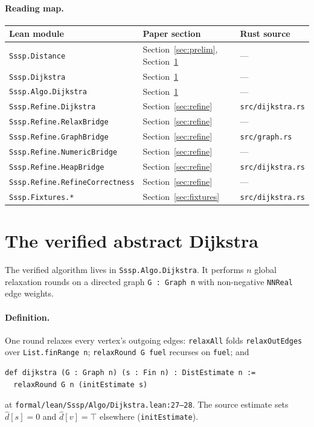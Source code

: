 \documentclass[11pt,a4paper]{article}
\providecommand{\cref}[1]{Section~\ref{#1}}
\newcommand{\Dijkstra}{Dijkstra\xspace}
\newcommand{\dhat}{\hat{d}}
\newcommand{\code}[1]{\texttt{#1}}
\theoremstyle{plain}
\theoremstyle{definition}
\begin{document}
\paragraph*{Reading map.}
\begin{center}
\small
\begin{tabular}{@{}lll@{}}
\hline
Lean module & Paper section & Rust source \\
\hline
\code{Sssp.Distance} & \cref{sec:prelim}, \cref{sec:algo} & --- \\
\code{Sssp.Dijkstra} & \cref{sec:algo} & --- \\
\code{Sssp.Algo.Dijkstra} & \cref{sec:algo} & --- \\
\code{Sssp.Refine.Dijkstra} & \cref{sec:refine} & \code{src/dijkstra.rs} \\
\code{Sssp.Refine.RelaxBridge} & \cref{sec:refine} & --- \\
\code{Sssp.Refine.GraphBridge} & \cref{sec:refine} & \code{src/graph.rs} \\
\code{Sssp.Refine.NumericBridge} & \cref{sec:refine} & --- \\
\code{Sssp.Refine.HeapBridge} & \cref{sec:refine} & \code{src/dijkstra.rs} \\
\code{Sssp.Refine.RefineCorrectness} & \cref{sec:refine} & --- \\
\code{Sssp.Fixtures.*} & \cref{sec:fixtures} & \code{src/dijkstra.rs} \\
\hline
\end{tabular}
\end{center}

\section{The verified abstract \Dijkstra}\label{sec:algo}

The verified algorithm lives in \code{Sssp.Algo.Dijkstra}. It performs
$n$ global relaxation rounds on a directed graph \code{G : Graph n} with
non-negative \code{NNReal} edge weights.

\paragraph*{Definition.}
One round relaxes every vertex's outgoing edges:
\code{relaxAll} folds \code{relaxOutEdges} over \code{List.finRange n};
\code{relaxRound G fuel} recurses on \code{fuel}; and
\begin{verbatim}
def dijkstra (G : Graph n) (s : Fin n) : DistEstimate n :=
  relaxRound G n (initEstimate s)
\end{verbatim}
at \code{formal/lean/Sssp/Algo/Dijkstra.lean:27--28}.
The source estimate sets $\dhat[s]=0$ and $\dhat[v]=\top$ elsewhere
(\code{initEstimate}).
\end{document}
